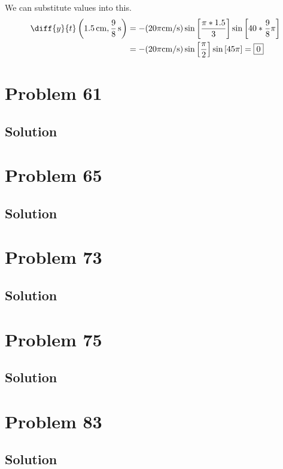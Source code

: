 \documentclass[12pt]{article}
\begin{document}
            We can substitute values into this.
            \begin{align}
                \diff{y}{t} \left( 1.5\,\unit{\centi\meter},\frac{9}{8}\,\unit{\second} \right) &=  -(20\pi \unit{\centi\meter/\second}) \sin \left[ \frac{\pi * 1.5}{3} \right] \sin\left[ 40 * \frac{9}{8}\pi \right]\\
                    &=  -(20\pi \unit{\centi\meter/\second}) \sin \left[ \frac{\pi}{2} \right] \sin\left[ 45\pi \right]
                    =   \boxed{0}
            \end{align}

    \pagebreak
    \section{Problem 61}

        \subsection{Solution}

    \pagebreak
    \section{Problem 65}

        \subsection{Solution}

    \pagebreak
    \section{Problem 73}

        \subsection{Solution}

    \pagebreak
    \section{Problem 75}

        \subsection{Solution}

    \pagebreak
    \section{Problem 83}

        \subsection{Solution}

    \pagebreak

    \tableofcontents
    
\end{document}
